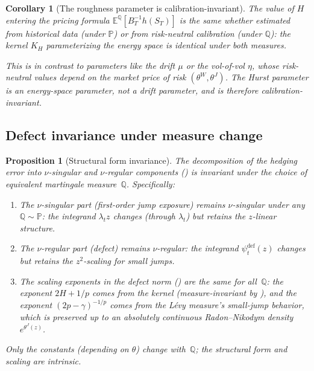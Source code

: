 \documentclass[11pt,a4paper]{article}
\theoremstyle{plain}
\newtheorem{proposition}[theorem]{Proposition}
\newtheorem{corollary}[theorem]{Corollary}
\theoremstyle{definition}
\theoremstyle{remark}
\newcommand{\E}{\mathbb{E}}
\newcommand{\PP}{\mathbb{P}}
\newcommand{\QQ}{\mathbb{Q}}
\begin{document}
\begin{corollary}[The roughness parameter is calibration-invariant]
\label{cor:roughness-greek}
The value of $H$ entering the pricing formula
$\E^\QQ[B_T^{-1}h(S_T)]$ is the same whether estimated from
historical data (under $\PP$) or from risk-neutral calibration
(under $\QQ$): the kernel $K_H$ parameterizing the energy
space is identical under both measures.

This is in contrast to parameters like the drift $\mu$ or
the vol-of-vol $\eta$, whose risk-neutral values depend on
the market price of risk $(\theta^W, \theta^J)$.  The Hurst
parameter is an energy-space parameter, not a drift parameter,
and is therefore calibration-invariant.
\end{corollary}



\subsection{Defect invariance under measure change}
\label{sec:defect-invariance}

\begin{proposition}[Structural form invariance]
\label{prop:defect-form-invariance}
The decomposition of the hedging error into $\nu$-singular and
$\nu$-regular components () is
invariant under the choice of equivalent martingale
measure~$\QQ$.  Specifically:
\begin{enumerate}[label=(\alph*)]
\item The $\nu$-singular part (first-order jump exposure)
  remains $\nu$-singular under any $\QQ \sim \PP$: the
  integrand $\lambda_t z$ changes (through $\lambda_t$)
  but retains the $z$-linear structure.
\item The $\nu$-regular part (defect) remains $\nu$-regular:
  the integrand $\psi_t^{\mathrm{def}}(z)$ changes but retains
  the $z^2$-scaling for small jumps.
\item The \emph{scaling exponents} in the defect norm
  () are the same for all~$\QQ$: the
  exponent $2H + 1/p$ comes from the kernel (measure-invariant
  by ), and the exponent
  $(2p - \gamma)^{-1/p}$ comes from the L\'evy measure's
  small-jump behavior, which is preserved up to an absolutely
  continuous Radon--Nikodym density $e^{\theta^J(z)}$.
\end{enumerate}
Only the \emph{constants} (depending on $\theta$) change
with~$\QQ$; the structural form and scaling are intrinsic.
\end{proposition}
\end{document}
